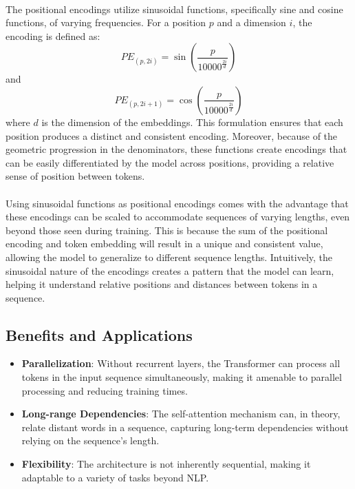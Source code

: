             \paragraph{}The positional encodings utilize sinusoidal functions, specifically sine and cosine functions, of varying frequencies. For a position \(p\) and a dimension \(i\), the encoding is defined as:
            \[
            PE_{(p, 2i)} = \sin\left(\frac{p}{10000^{\frac{2i}{d}}}\right)
            \]
            and
            \[
            PE_{(p, 2i+1)} = \cos\left(\frac{p}{10000^{\frac{2i}{d}}}\right)
            \]
            where \(d\) is the dimension of the embeddings. This formulation ensures that each position produces a distinct and consistent encoding. Moreover, because of the geometric progression in the denominators, these functions create encodings that can be easily differentiated by the model across positions, providing a relative sense of position between tokens.
            
            \paragraph{}Using sinusoidal functions as positional encodings comes with the advantage that these encodings can be scaled to accommodate sequences of varying lengths, even beyond those seen during training. This is because the sum of the positional encoding and token embedding will result in a unique and consistent value, allowing the model to generalize to different sequence lengths. Intuitively, the sinusoidal nature of the encodings creates a pattern that the model can learn, helping it understand relative positions and distances between tokens in a sequence.
            
        
        \subsection{Benefits and Applications}
        
            \begin{itemize}
                \item \textbf{Parallelization}: Without recurrent layers, the Transformer can process all tokens in the input sequence simultaneously, making it amenable to parallel processing and reducing training times.
                \item \textbf{Long-range Dependencies}: The self-attention mechanism can, in theory, relate distant words in a sequence, capturing long-term dependencies without relying on the sequence's length.
                \item \textbf{Flexibility}: The architecture is not inherently sequential, making it adaptable to a variety of tasks beyond NLP.
            \end{itemize}
            
